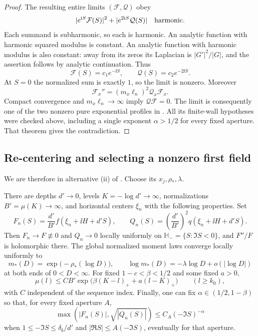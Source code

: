 \begin{proof}
The resulting entire limits \((\mathcal F,\mathcal Q)\) obey
\[
 |e^{\mathrm i S}\mathcal F(S)|^2
       +|e^{2\mathrm i S}\mathcal Q(S)|
 \quad\hbox{harmonic}.
\]
Each summand is subharmonic, so each is harmonic.  An analytic
function with harmonic squared modulus is constant.  An analytic
function with harmonic modulus is also constant: away from its
zeros its Laplacian is \(|G'|^2/|G|\), and the assertion follows
by analytic continuation.  Thus
\[
 \mathcal F(S)=c_1e^{-\ii S},\qquad
 \mathcal Q(S)=c_2e^{-2\ii S}.
\]
At \(S=0\) the normalized sum is exactly \(1\), so the limit is
nonzero.  Moreover
\[
 \mathcal F_x''=(m_x\ell_n)^2\mathcal Q_x\mathcal F_x.
\]
Compact convergence and \(m_x\ell_n\to\infty\) imply
\(\mathcal Q\mathcal F=0\).  The limit is consequently one of
the two nonzero pure exponential profiles in
.  All its finite-wall hypotheses
were checked above, including a single exponent \(\alpha>1/2\)
for every fixed aperture.  That theorem gives the contradiction.
\end{proof}

\subsection{Re-centering and selecting a nonzero first field}
\label{model:selection-subsection}

We are therefore in alternative \textup{(ii)} of
.  Choose its \(x_j,\rho_*,\lambda\).

\begin{lemma}
\label{model:selected-fields}
There are depths \(d'\to0\), levels \(K=-\log d'\to\infty\),
normalizations \(B'=\mu(K)\to\infty\), and horizontal centers
\(\xi_n\) with the following properties.  Set
\begin{equation}
\label{model:selected-normalization}
 F_n(S)=\frac{d'}{B'}f(\xi_n+\ii H+d'S),\qquad
 Q_n(S)=\left(\frac{d'}{B'}\right)^2q(\xi_n+\ii H+d'S).
\end{equation}
Then \(F_n\to F\not\equiv0\) and \(Q_n\to0\) locally uniformly on
\(\mathbb H_-=\{S:\Im S<0\}\), and \(F''/F\) is holomorphic there.
The global normalized moment laws converge locally uniformly to
\begin{equation}
\label{model:star-moment}
 m_*(D)=\exp\bigl(-\rho_*(\log D)\bigr),\qquad
 \log m_*(D)=-\lambda\log D+o(|\log D|)
\end{equation}
at both ends of \(0<D<\infty\).  For fixed
\(1-c<\beta<1/2\) and some fixed \(a>0\),
\begin{equation}
\label{model:new-global-envelope}
 \mu(l)\le C B'
 \exp\bigl(\beta(K-l)_++a(l-K)_+\bigr)
 \qquad(l\ge k_0),
\end{equation}
with \(C\) independent of the sequence index.  Finally, one can fix
\(\alpha\in(1/2,1-\beta)\) so that, for every fixed aperture \(A\),
\begin{equation}
\label{model:selected-cones}
 \max(|F_n(S)|,\sqrt{|Q_n(S)|})
 \le C_A(-\Im S)^{-\alpha}
\end{equation}
when \(1\le-\Im S\le\delta_b/d'\) and
\(|\Re S|\le A(-\Im S)\), eventually for that aperture.
\end{lemma}

